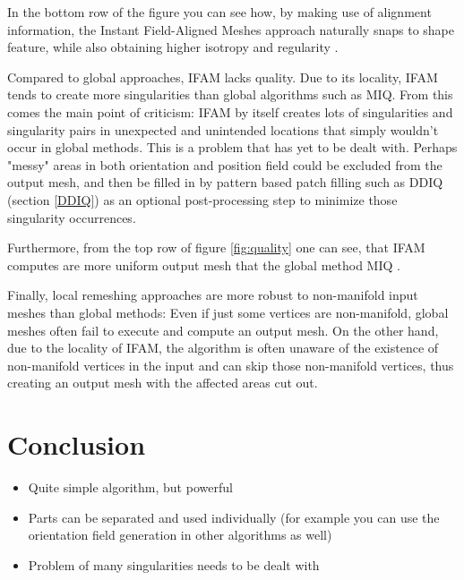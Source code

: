 \documentclass{ACGSeminar}
\begin{document}
In the bottom row of the figure you can see how, by making use of alignment information, the Instant Field-Aligned Meshes approach naturally snaps to shape feature, while also obtaining higher isotropy and regularity \cite{jakob2015instant}.

Compared to global approaches, IFAM lacks quality. Due to its locality, IFAM tends to create more singularities than global algorithms such as MIQ. From this comes the main point of criticism: IFAM by itself creates lots of singularities and singularity pairs in unexpected and unintended locations that simply wouldn't occur in global methods. This is a problem that has yet to be dealt with. Perhaps "messy" areas in both orientation and position field could be excluded from the output mesh, and then be filled in by pattern based patch filling such as DDIQ (section \ref{DDIQ}) as an optional post-processing step to minimize those singularity occurrences.

Furthermore, from the top row of figure \ref{fig:quality} one can see, that IFAM computes are more uniform output mesh that the global method MIQ \cite{jakob2015instant}.\bigskip

Finally, local remeshing approaches are more robust to non-manifold input meshes than global methods: Even if just some vertices are non-manifold, global meshes often fail to execute and compute an output mesh. On the other hand, due to the locality of IFAM, the algorithm is often unaware of the existence of non-manifold vertices in the input and can skip those non-manifold vertices, thus creating an output mesh with the affected areas cut out.

\section{Conclusion}
\begin{itemize}
	\item	Quite simple algorithm, but powerful
	\item	Parts can be separated and used individually (for example you can use the orientation field generation in other algorithms as well)
	\item	Problem of many singularities needs to be dealt with
\end{itemize}

\label{cha:references}
\printbibliography
\end{document}
